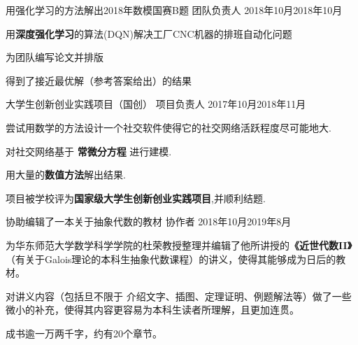 
\begin{projitem}
    {用强化学习的方法解出2018年数模国赛B题}
    {团队负责人}
    {2018年10月}{2018年10月 }
    \item 用\textbf{深度强化学习}的算法(DQN)解决工厂CNC机器的排班自动化问题
    \item 为团队编写论文并排版
    \item 得到了接近最优解（参考答案给出）的结果
\end {projitem}
\begin{projitem}
    {大学生创新创业实践项目（国创）}
    {项目负责人}
    {2017年10月}{2018年11月}
    \item 尝试用数学的方法设计一个社交软件使得它的社交网络活跃程度尽可能地大.
    \item 对社交网络基于 \textbf{常微分方程} 进行建模.
    \item 用大量的\textbf{数值方法}解出结果.
    \item 项目被学校评为\textbf{国家级大学生创新创业实践项目},并顺利结题.
\end{projitem}
\begin{projitem}
    {协助编辑了一本关于抽象代数的教材}
    {协作者}
    {2018年10月}{2019年8月}
    \item 为华东师范大学数学科学学院的杜荣教授整理并编辑了他所讲授的\textbf{《近世代数II》}（有关于Galois理论的本科生抽象代数课程）的讲义，使得其能够成为日后的教材。
    \item 对讲义内容（包括旦不限于 介绍文字、插图、定理证明、例题解法等）做了一些微小的补充，使得其内容更容易为本科生读者所理解，且更加连贯。
    \item 成书逾一万两千字，约有20个章节。
\end{projitem}

\endinput
